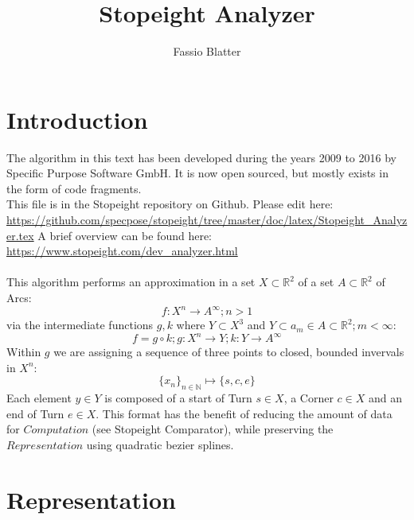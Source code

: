 \documentclass{article}
\begin{document}
\title{Stopeight Analyzer}
\author{Fassio Blatter}
\maketitle

\section{Introduction}

The algorithm in this text has been developed during the years 2009 to 2016 by Specific Purpose Software GmbH. It is now open sourced, but mostly exists in the form of code fragments.\\
This file is in the Stopeight repository on Github. Please edit here:\\
\href{https://github.com/specpose/stopeight/tree/master/doc/latex/Stopeight_Analyzer.tex}{https://github.com/specpose/stopeight/tree/master/doc/latex/Stopeight\_Analyzer.tex}
A brief overview can be found here:\\
\href{https://www.stopeight.com/dev_analyzer.html}{https://www.stopeight.com/dev\_analyzer.html}\\\\
This algorithm performs an approximation in a set $X \subset \mathbb{R}^2$ of a set $A \subset \mathbb{R}^2$ of Arcs:
\begin{equation}
f: X^n \rightarrow A^\infty; n>1
\end{equation}
via the intermediate functions $g,k$ where $Y \subset X^3$ and $Y \subset a_{m} \in A \subset \mathbb{R}^2;m<\infty$:
\begin{equation}
f = g \circ k; g: X^n \rightarrow Y; k: Y \rightarrow A^\infty
\end{equation}
Within $g$ we are assigning a sequence of three points to closed, bounded invervals in $X^n$:
\begin{equation}
\{x_{n}\}_{n \in \mathbb{N}} \mapsto \{s,c,e\}
\end{equation}
Each element $y \in Y$ is composed of a start of Turn $s \in X$, a Corner $c \in X$ and an end of Turn $e \in X$. This format has the benefit of reducing the amount of data for $Computation$ (see Stopeight Comparator), while preserving the $Representation$ using quadratic bezier splines.

\section{Representation}
\end{document}
